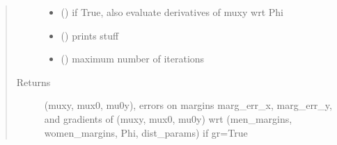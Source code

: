 \documentclass[letterpaper,10pt,english]{sphinxmanual}
\begin{document}
\begin{fulllineitems}
\begin{quote}
\begin{description}
\begin{itemize}
\item {} 
 () \textendash{} if True, also evaluate derivatives of muxy wrt Phi

\item {} 
 () \textendash{} prints stuff

\item {} 
 () \textendash{} maximum number of iterations

\end{itemize}

\item[{Returns}] \leavevmode
(muxy, mux0, mu0y), errors on margins marg\_err\_x, marg\_err\_y,
and gradients of (muxy, mux0, mu0y)
wrt (men\_margins, women\_margins, Phi, dist\_params) if gr=True

\end{description}\end{quote}

\end{fulllineitems}

\end{document}
